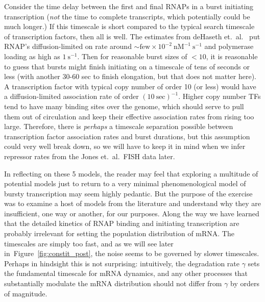 \documentclass[12pt]{article}%
\newcommand{\fig}[1]{Figure~\ref{#1}}
\begin{document}
Consider the time delay between the first and final RNAPs
in a burst initiating transcription
(\textit{not} the time to complete transcripts,
which potentially could be much longer.)
If this timescale is short compared to the typical
search timescale of transcription factors, then all is well.
The estimates from deHaseth et.\ al.~\cite{DeHaseth1998}
put RNAP's diffusion-limited on rate around
$\sim\text{few}\times10^{-2}~\text{nM}^{-1}~\text{s}^{-1}$
and polymerase loading as high as $1~\text{s}^{-1}$.
Then for reasonable burst sizes of $<10$, it is reasonable to guess that
bursts might finish initiating on a timescale of tens of seconds or less
(with another 30-60 sec to finish elongation, but that does not matter here).
A transcription factor with typical copy number of order 10 (or less)
would have a diffusion-limited association rate of order
$(10~\text{sec})^{-1}$.
Higher copy number TFs tend to have many binding sites over the genome,
which should serve to pull them out of circulation and keep their
effective association rates from rising too large.
Therefore, there is \textit{perhaps} a timescale separation
possible between transcription factor association rates and burst
durations, but this assumption could very well break down, so we
will have to keep it in mind when we infer repressor rates from
the Jones et.\ al.\ FISH data later.

In reflecting on these 5 models, the reader may feel that
exploring a multitude of potential models just to return to a
very minimal phenomenological model of bursty transcription may
seem highly pedantic. But the purpose of the exercise was to
examine a host of models from the literature and understand why
they are insufficient, one way or another, for our purposes.
Along the way we have learned that the detailed kinetics of RNAP
binding and initiating transcription are probably irrelevant for
setting the population distribution of mRNA.
The timescales are simply too fast, and as we will see later
in~\fig{fig:constit_post}, the noise seems to be governed by
slower timescales. Perhaps in hindsight this is not surprising:
intuitively, the degradation rate $\gamma$ sets the fundamental
timescale for mRNA dynamics, and any other processes that
substantially modulate the mRNA distribution should not differ
from $\gamma$ by orders of magnitude.
\end{document}
